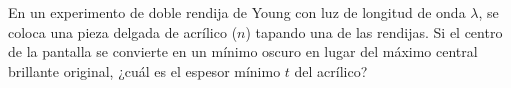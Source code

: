 \item En un experimento de doble rendija de Young con luz de longitud de onda $\lambda$, se coloca una pieza delgada de acrílico ($n$) tapando una de las rendijas. Si el centro de la pantalla se convierte en un mínimo oscuro en lugar del máximo central brillante original, ¿cuál es el espesor mínimo $t$ del acrílico?